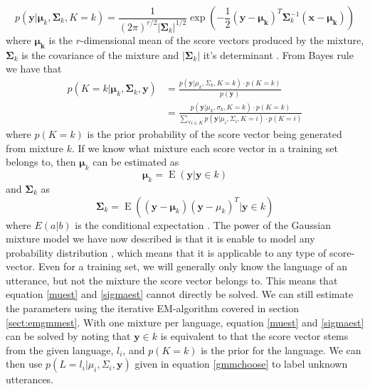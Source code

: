 \begin{equation}
\label{gmmeq}
p(\mathbf{y} | \mathbf{\mu}_k, \mathbf{\Sigma}_k, K = k) = \frac{1}{(2\pi)^{r/2}|\mathbf{\Sigma}_k|^{1/2}}\exp(-\frac{1}{2}(\mathbf{y}-\mathbf{\mu_k})^T\mathbf{\Sigma}_k^{-1}(\mathbf{x}-\mathbf{\mu_k}))
\end{equation}
where $\mathbf{\mu_k}$ is the $r$-dimensional mean of the score vectors produced by the mixture, $\mathbf{\Sigma}_k$ is the covariance of the mixture and $|\mathbf{\Sigma}_k|$ it's determinant \cite[p. 94]{talegk}. From Bayes rule we have that
\begin{align}
p(K=k | \mathbf{\mu}_k, \mathbf{\Sigma}_k, \mathbf{y}) &= 
\frac{p(\mathbf{y} | \mu_k, \Sigma_k, K= k) \cdot p(K=k )}{p(\mathbf{y})} \nonumber \\
&= \frac{p(\mathbf{y} | \mu_k, \sigma_k, K=k) \cdot p(K=k)}{\sum_{\forall i \in K} p(\mathbf{y} | \mu_i, \Sigma_i, K=i) \cdot p(K=i)} \label{gmmchoose}
\end{align}
where $p(K=k)$ is the prior probability of the score vector being generated from mixture $k$. If we know what mixture each score vector in a training set belongs to, then $\mathbf{\mu}_k$ can be estimated as
\begin{equation}
\label{muest}
\mathbf{\mu}_k = \operatorname{E}(\mathbf{y} | \mathbf{y} \in k)
\end{equation}
and $\mathbf{\Sigma}_k$ as
\begin{equation}
\label{sigmaest}
\mathbf{\Sigma}_k = \operatorname{E}\left( (\mathbf{y}-\mathbf{\mu}_k)(\mathbf{y}-\mu_k)^T | \mathbf{y} \in k \right)
\end{equation}
where $E(a|b)$ is the conditional expectation \cite[p. 94]{talegk}. The power of the Gaussian mixture model we have now described is that it is enable to model any probability distribution \cite[p. 95]{talegk}, which means that it is applicable to any type of score-vector. Even for a training set, we will generally only know the language of an utterance, but not the mixture the score vector belongs to. This means that equation \ref{muest} and \ref{sigmaest} cannot directly be solved. We can still estimate the parameters using the iterative EM-algorithm covered in section \ref{sect:emgmmest}. With one mixture per language, equation \ref{muest} and \ref{sigmaest} can be solved by noting that $\mathbf{y} \in k$ is equivalent to that the score vector stems from the given language, $l_i$, and $p(K=k)$ is the prior for the language. We can then use $p(L=l_i | \mu_i, \Sigma_i, \mathbf{y})$ given in equation \ref{gmmchoose} to label unknown utterances.


